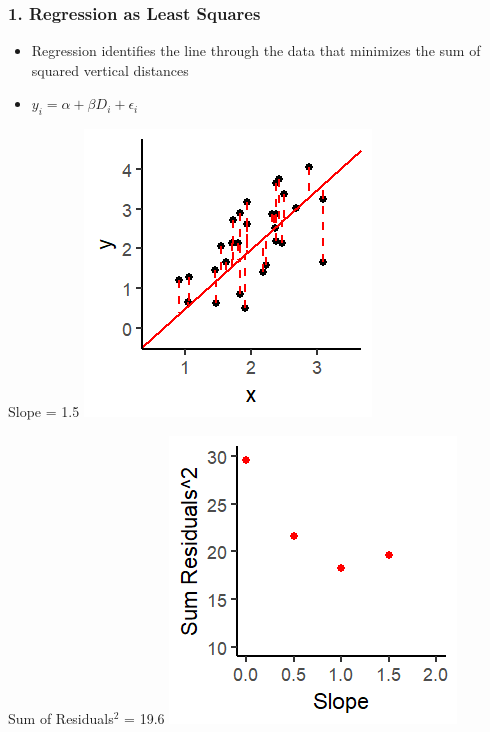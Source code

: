 \documentclass[xcolor=x11names,compress]{beamer}\usepackage[]{graphicx}\usepackage[]{color}
\makeatletter
\def\maxwidth{ %
  \ifdim\Gin@nat@width>\linewidth
    \linewidth
  \else
    \Gin@nat@width
  \fi
}
\newenvironment{knitrout}{}{} %
\renewcommand{\(}{\begin{columns}}
\renewcommand{\)}{\end{columns}}
\newcommand{\<}[1]{\begin{column}{#1}}
\renewcommand{\>}{\end{column}}
\makeatother
\begin{document}
\begin{frame}
\frametitle{1. Regression as Least Squares}
\begin{itemize}
\item Regression identifies the line through the data that minimizes the sum of squared vertical distances 
\item $y_i = \alpha + \beta D_i + \epsilon_i$
\end{itemize}
\begin{multicols}{2}
Slope = 1.5
\begin{knitrout}
\color{fgcolor}
\includegraphics[width=\maxwidth]{figure/graph_ols4-1} 

\end{knitrout}
\columnbreak
Sum of Residuals$^2$ = 19.6
\begin{knitrout}
\color{fgcolor}
\includegraphics[width=\maxwidth]{figure/graph_ssr4-1} 

\end{knitrout}
\end{multicols}
\end{frame}
\end{document}
